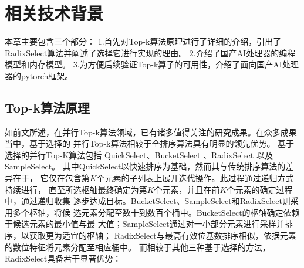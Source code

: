 \chapter{相关技术背景}
本章主要包含三个部分：
1.首先对Top-k算法原理进行了详细的介绍，引出了RadixSelect算法并阐述了选择它进行实现的理由。
2.介绍了国产AI处理器的编程模型和内存模型。
3.为方便后续验证Top-k算子的可用性，介绍了面向国产AI处理器的pytorch框架。
\section{Top-k算法原理}

如前文所述，在并行Top-k算法领域，已有诸多值得关注的研究成果。在众多成果当中，基于选择的
并行Top-k算法相较于全排序算法具有明显的领先优势。
基于选择的并行Top-K算法包括
QuickSelect、BucketSelect 、RadixSelect 以及SampleSelect\cite{alabi2012fast}\cite{ribizel2020parallel}。
其中QuickSelect以快速排序为基础，然而其与传统排序算法的差异在于，
它仅在包含第$K$个元素的子列表上展开迭代操作。此过程通过递归方式持续进行，
直至所选枢轴最终确定为第$K$个元素，并且在前$K$个元素的确定过程中，通过递归收集
逐步达成目标。BucketSelect、SampleSelect和RadixSelect则采用多个枢轴，将候
选元素分配至数十到数百个桶中。BucketSelect的枢轴确定依赖于候选元素的最小值与最
大值；SampleSelect通过对一小部分元素进行采样并排序，以获取更为适宜的枢轴；
RadixSelect与最高有效位基数排序相似，依据元素的数位特征将元素分配至相应桶中。
而相较于其他三种基于选择的方法，RadixSelect具备若干显著优势：

